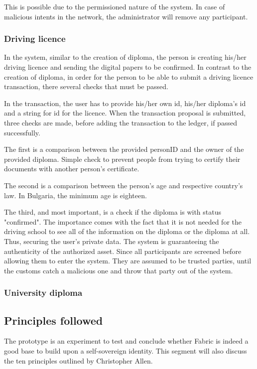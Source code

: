 \documentclass[a4paper,11pt]{report}
\begin{document}
	This is possible due to the permissioned nature of the system. In case of malicious intents in the network, the administrator will remove any participant. 

\subsubsection{Driving licence}

	In the system, similar to the creation of diploma, the person is creating his/her driving licence and sending the digital papers to be confirmed. In contrast to the creation of diploma, in order for the person to be able to submit a driving licence transaction, there several checks that must be passed. 
	
	In the transaction, the user has to provide his/her own id, his/her diploma's id and a string for id for the licence. When the transaction proposal is submitted, three checks are made, before adding the transaction to the ledger, if passed successfully. 

	The first is a comparison between the provided personID and the owner of the provided diploma. Simple check to prevent people from trying to certify their documents with another person's certificate.
	
	The second is a comparison between the person’s age and respective country's law. In Bulgaria, the minimum age is eighteen. 
	
	The third, and most important, is a check if the diploma is with status "confirmed". The importance comes with the fact that it is not needed for the driving school to see all of the information on the diploma or the diploma at all. Thus, securing the user's private data. The system is guaranteeing the authenticity of the authorized asset. Since all participants are screened before allowing them to enter the system. They are assumed to be trusted parties, until the customs catch a malicious one and throw that party out of the system. 


\subsubsection{University diploma}
\subsection{Principles followed}
The prototype is an experiment to test and conclude whether Fabric is indeed a good base to build upon a self-sovereign identity. This segment will also discuss the ten principles outlined by Christopher Allen.
	
\end{document}

